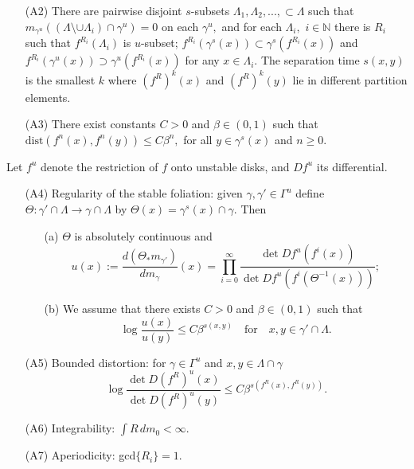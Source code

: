 \documentclass[a4paper,12pt]{amsart}
\numberwithin{equation}{section}
\begin{document}
\begin{itemize}
\item[(A2)] There are pairwise disjoint $s$-subsets $\Lambda_1, \Lambda_2,
..., \subset\Lambda$ such that \\$m_{\gamma^u}((\Lambda\setminus\cup
\Lambda_i)\cap\gamma^u)=0$ on each $\gamma^u,$ and for each
$\Lambda_i,$ $i\in\mathbb{N}$ there is $R_i$ such that
$f^{R_i}(\Lambda_i)$ is $u$-subset;
$f^{R_i}(\gamma^s(x))\subset\gamma^s(f^{R_i}(x))$ and
$f^{R_i}(\gamma^u(x))\supset\gamma^u(f^{R_i}(x))$ for any
$x\in\Lambda_i.$ The separation time $s(x, y)$ is the smallest $k$
where $(f^R)^k(x)$ and $(f^R)^k(y)$ lie in different partition
elements.

\item[(A3)] There exist constants $C> 0$ and $\beta\in(0, 1)$ such that
 \\$\text{dist}(f^n(x), f^n(y))\le C\beta^n,$ for all
$y\in\gamma^s(x)$ and $n\ge 0.$
\end{itemize}

Let $f^u$ denote the restriction of $f$ onto unstable disks, and
$Df^u$ its differential.

\begin{itemize}
\item[(A4)] Regularity of the stable foliation:
given $\gamma, \gamma'\in \Gamma^u$ define $\Theta:\gamma'\cap
\Lambda\to \gamma\cap \Lambda$ by $\Theta(x)=\gamma^s(x)\cap\gamma.$
Then
\begin{itemize}
\item[(a)] $\Theta$ is absolutely continuous and
$$u(x):=\frac{d(\Theta_\ast m_{\gamma'})}{dm_\gamma}(x)=\prod_{i=0}^{\infty}
\frac{\det Df^u(f^i(x))}{\det Df^u(f^i(\Theta^{-1}(x)))};$$
\item[(b)] We assume that there exists $C>0$ and $\beta\in(0, 1)$
such that
$$\log\frac{u(x)}{u(y)}\le C\beta^{s(x, y)}\quad \text{for}\quad x, y\in\gamma'\cap \Lambda.$$
\end{itemize}

\item[(A5)] Bounded distortion: for $\gamma\in\Gamma^u$ and $x, y\in \Lambda\cap\gamma$
$$\log\frac{\det D(f^R)^u(x)}{\det D(f^R)^u(y)}\le C\beta^{s(f^R(x), f^R(y))}.$$

\item[(A6)] Integrability: $\int R\,dm_0<\infty.$
\item[(A7)] Aperiodicity: gcd$\{R_i\}=1.$
\end{itemize}
\end{document}
